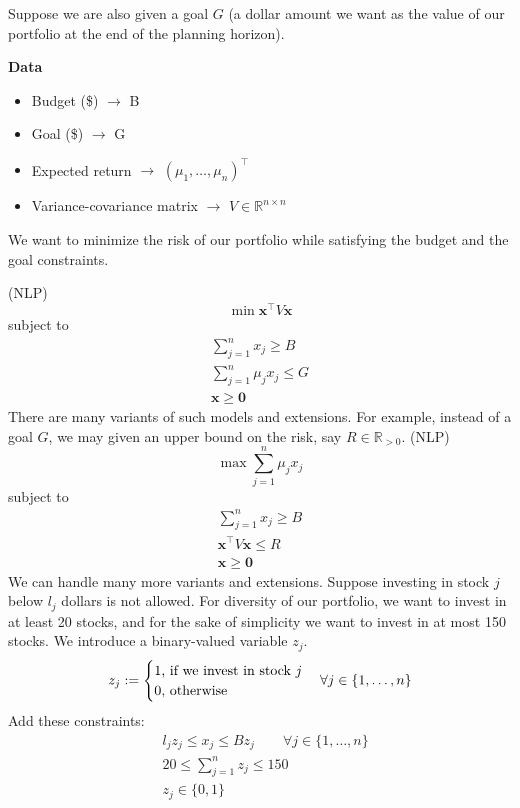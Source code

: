 Suppose we are also given a goal $G$ (a dollar amount we want as the value
of our portfolio at the end of the planning horizon).

\textbf{Data}
\begin{itemize}
    \item Budget (\$) $\rightarrow$ B
    \item Goal (\$) $\rightarrow$ G
    \item Expected return $\rightarrow$ $ (\mu_1,\ldots,\mu_n)^\top $
    \item Variance-covariance matrix $\rightarrow$ 
    $V\in \mathbb{R}^{n\times n}$
\end{itemize}
We want to minimize the risk of our portfolio while satisfying the budget and
the goal constraints. 

(NLP)
\[\min \bm{x}^\top  V\bm{x}\]
subject to
\begin{align*}
    \sum_{j = 1}^{n}x_j\ge B\\
    \sum_{j = 1}^{n}\mu_jx_j\le G\\
    \bm{x}\ge \bm{0}
\end{align*}
There are many variants of such models and extensions. For example, instead
of a goal $G$, we may given an upper bound on the risk, say 
$R\in\mathbb{R}_{>0}$. (NLP)
\[\max \sum_{j = 1}^{n}\mu_jx_j\]
subject to
\begin{align*}
    \sum_{j = 1}^{n}x_j\ge B\\
    \bm{x}^\top  V\bm{x}\le R\\
    \bm{x}\ge \bm{0}
\end{align*}
We can handle many more variants and extensions. Suppose investing in stock
$j$ below $l_j$ dollars is not allowed. For diversity of our portfolio, we
want to invest in at least 20 stocks, and for the sake of simplicity we want
to invest in at most 150 stocks. We introduce a binary-valued variable $z_j$.
\[z_j:=
\begin{cases}
    1 \text{, if we invest in stock $j$}\\
    0 \text{, otherwise}
\end{cases}
\forall j\in\{1,\dots,n\}\\
\]
Add these constraints:
\begin{align*}
    &l_j z_j\le x_j\le B z_j\qquad \forall j\in\{1,\dots,n\}\\
    &20\le \sum_{j = 1}^{n}z_j\le 150\\
    &z_j\in\{0,1\}
\end{align*}